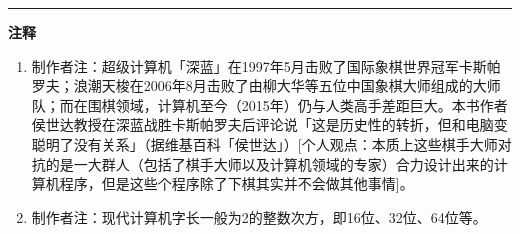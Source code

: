 \documentclass[
  12pt,
  twoside,
  openright,
  oldfontcommands,
]{memoir}
\begin{document}
{\footnotesize\setlength{\parindent}{0pt}%
\noindent\textcolor{rulegray}{\rule{0.35\linewidth}{0.3pt}}\par\vspace{2pt}
\noindent\textbf{注释}\par\vspace{3pt}
\begin{enumerate}
\label{fn:Chapter10-1}{}
\item 制作者注：超级计算机「深蓝」在1997年5月击败了国际象棋世界冠军卡斯帕罗夫；浪潮天梭在2006年8月击败了由柳大华等五位中国象棋大师组成的大师队；而在围棋领域，计算机至今（2015年）仍与人类高手差距巨大。本书作者侯世达教授在深蓝战胜卡斯帕罗夫后评论说「这是历史性的转折，但和电脑变聪明了没有关系」（据维基百科「侯世达」）[个人观点：本质上这些棋手大师对抗的是一大群人（包括了棋手大师以及计算机领域的专家）合力设计出来的计算机程序，但是这些个程序除了下棋其实并不会做其他事情]。
\label{fn:Chapter10-2}{}
\item 制作者注：现代计算机字长一般为2的整数次方，即16位、32位、64位等。
\end{enumerate}
}

\label{Dialog11.xhtml}{}
\end{document}
